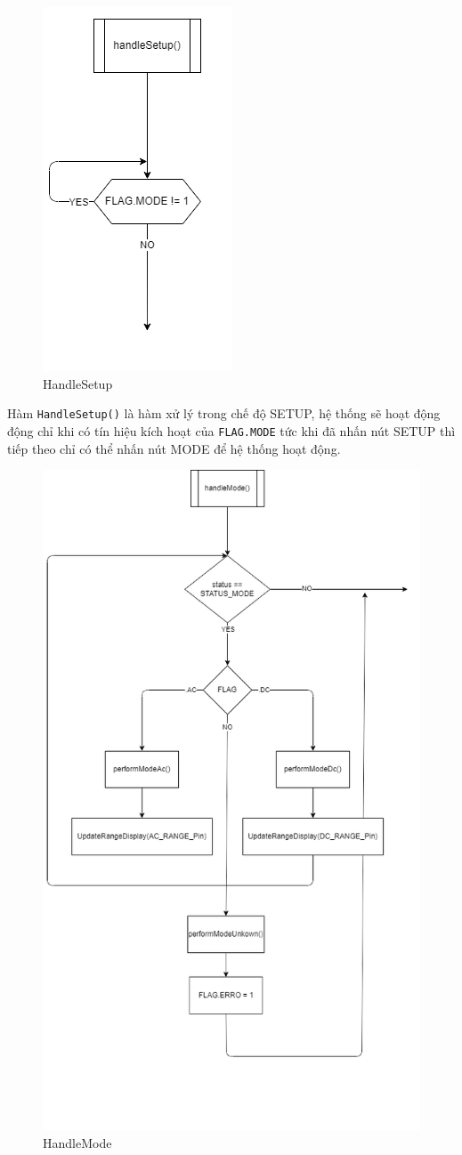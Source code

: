 \begin{figure}[H]
	\centering
	\includegraphics[width=0.3\linewidth]{./diagram/handleSetup.png}
	\caption{HandleSetup}
	\label{f_handlesetup}
\end{figure}

Hàm \texttt{HandleSetup()} là hàm xử lý trong chế độ SETUP, hệ thống sẽ hoạt động động chỉ khi có tín hiệu kích hoạt của \texttt{FLAG.MODE} tức khi đã nhấn nút SETUP thì tiếp theo chỉ có thể nhấn nút MODE để hệ thống hoạt động.

\begin{figure}[H]
	\centering
	\includegraphics[width=0.7\linewidth]{./diagram/handleMode.png}
	\caption{HandleMode}
	\label{f_handlemode}
\end{figure}

